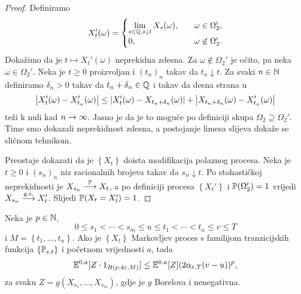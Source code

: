 \documentclass[main.tex]{subfiles}
\begin{document}
\begin{proof}
	Definiramo
	\begin{equation} X_t'(\omega) =
		\begin{cases}
			\lim\limits_{s \in \Q, s \downarrow t}  X_s(\omega), \quad & \omega \in \Omega_2',      \\
			0, \quad                                                   & \omega \not \in \Omega_2'.
		\end{cases}
	\end{equation}
	Dokažimo da je \( t \mapsto X_t'(\omega) \) neprekidna zdesna. Za \( \omega \not \in \Omega_2' \) je očito, pa neka
	\( \omega \in \Omega_2' \). Neka je \( t \ge 0 \) proizvoljan i \( (t_n)_n \) takav da \( t_n \downarrow t \). Za svaki \( n \in \N \)
	definiramo \( \delta_n > 0 \) takav da \( t_n + \delta_n \in \Q \) i takav da desna strana u
	\begin{equation}
		\abs{X'_t(\omega) - X'_{t_n}(\omega)} \le \abs{X'_t(\omega) - X_{t_n+\delta_n}(\omega)} + \abs{X_{t_n+\delta_n}(\omega) - X'_{t_n}(\omega)}
	\end{equation}
	teži k nuli kad \( n \ub \). Jasno je da je to moguće po definiciji skupa \( \Omega_2 \supseteq \Omega_2' \). Time smo dokazali neprekidnost zdesna,
	a postojanje limesa slijeva dokaže se sličnom tehnikom.

	Preostaje dokazati da je \( \left\{ X_t \right\} \) doista modifikacija polaznog procesa. Neka je \( t \ge 0 \) i \( (s_n)_n \) niz racionalnih brojeva
	takav da \( s_n \downarrow t \). Po stohastičkoj neprekidnosti je \( X_{s_n} \konvp X_t \), a po definiciji procesa \( \left\{ X_t' \right\} \) i \( \P(\Omega_2')=1 \) vrijedi
	\( X_{s_n} \konvgs X_t' \). Slijedi \( \P(X_t=X_t')=1 \).
\end{proof}

\begin{lema}
	Neka je \( p \in \N \),
	\[
		0 \le s_1 < \cdots < s_m \le u \le t_1 < \cdots < t_n \le v \le T
	\]
	i \( M = \left\{ t_1, \ldots, t_n \right\} \). Ako je \( \left\{ X_t \right\} \) Markovljev proces
	s familijom tranzicijskih funkcija \( \left\{ \Ptrans_{s,t} \right\} \) i početnom vrijednosti \( a \), tada
	\begin{equation}
		\E^{0,a}[Z \cdot 1_{B(p, 4\varepsilon, M)}] \le \E^{0,a}[Z](2\alpha_{\varepsilon, T}(v-u))^p,
	\end{equation}
	za svaku \( Z = g(X_{s_1},\ldots,X_{s_m}) \), gdje je \( g \) Borelova i nenegativna.
\end{lema}
\end{document}

